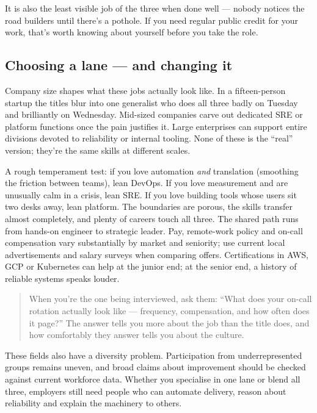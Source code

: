 It is also the least visible job of the three when done well — nobody notices the road builders until there's a pothole. If you need regular public credit for your work, that's worth knowing about yourself before you take the role.



\subsection{Choosing a lane — and changing it}


Company size shapes what these jobs actually look like. In a fifteen-person startup the titles blur into one generalist who does all three badly on Tuesday and brilliantly on Wednesday. Mid-sized companies carve out dedicated SRE or platform functions once the pain justifies it. Large enterprises can support entire divisions devoted to reliability or internal tooling. None of these is the ``real'' version; they're the same skills at different scales.


A rough temperament test: if you love automation \emph{and} translation (smoothing the friction between teams), lean DevOps. If you love measurement and are unusually calm in a crisis, lean SRE. If you love building tools whose users sit two desks away, lean platform. The boundaries are porous, the skills transfer almost completely, and plenty of careers touch all three. The shared path runs from hands-on engineer to strategic leader. Pay, remote-work policy and on-call compensation vary substantially by market and seniority; use current local advertisements and salary surveys when comparing offers. Certifications in AWS, GCP or Kubernetes can help at the junior end; at the senior end, a history of reliable systems speaks louder.



\begin{quote}\small
When you're the one being interviewed, ask them: ``What does your on-call rotation actually look like — frequency, compensation, and how often does it page?'' The answer tells you more about the job than the title does, and how comfortably they answer tells you about the culture.
\end{quote}


These fields also have a diversity problem. Participation from underrepresented groups remains uneven, and broad claims about improvement should be checked against current workforce data. Whether you specialise in one lane or blend all three, employers still need people who can automate delivery, reason about reliability and explain the machinery to others.

